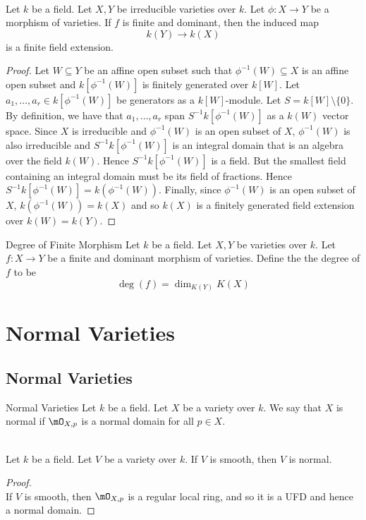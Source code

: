 \documentclass[a4paper]{article}
\begin{document}
\begin{prp}{}{}\\
Let $k$ be a field. Let $X,Y$ be irreducible varieties over $k$. Let $\phi:X\to Y$ be a morphism of varieties. If $f$ is finite and dominant, then the induced map $$k(Y)\to k(X)$$ is a finite field extension. 
\begin{proof}
Let $W\subseteq Y$ be an affine open subset such that $\phi^{-1}(W)\subseteq X$ is an affine open subset and $k[\phi^{-1}(W)]$ is finitely generated over $k[W]$. Let $a_1,\dots,a_r\in k[\phi^{-1}(W)]$ be generators as a $k[W]$-module. Let $S=k[W]\setminus\{0\}$. By definition, we have that $a_1,\dots,a_r$ span $S^{-1}k[\phi^{-1}(W)]$ as a $k(W)$ vector space. Since $X$ is irreducible and $\phi^{-1}(W)$ is an open subset of $X$, $\phi^{-1}(W)$ is also irreducible and $S^{-1}k[\phi^{-1}(W)]$ is an integral domain that is an algebra over the field $k(W)$. Hence $S^{-1}k[\phi^{-1}(W)]$ is a field. But the smallest field containing an integral domain must be its field of fractions. Hence $S^{-1}k[\phi^{-1}(W)]=k(\phi^{-1}(W))$. Finally, since $\phi^{-1}(W)$ is an open subset of $X$, $k(\phi^{-1}(W))=k(X)$ and so $k(X)$ is a finitely generated field extension over $k(W)=k(Y)$. 
\end{proof}
\end{prp}

\begin{defn}{Degree of Finite Morphism}{} Let $k$ be a field. Let $X,Y$ be varieties over $k$. Let $f:X\to Y$ be a finite and dominant morphism of varieties. Define the the degree of $f$ to be $$\deg(f)=\dim_{K(Y)}K(X)$$
\end{defn}

\pagebreak
\section{Normal Varieties}
\subsection{Normal Varieties}
\begin{defn}{Normal Varieties}{} Let $k$ be a field. Let $X$ be a variety over $k$. We say that $X$ is normal if $\mO_{X,p}$ is a normal domain for all $p\in X$. 
\end{defn}

\begin{lmm}{}{}\\
Let $k$ be a field. Let $V$ be a variety over $k$. If $V$ is smooth, then $V$ is normal. 
\begin{proof}\\
If $V$ is smooth, then $\mO_{X,p}$ is a regular local ring, and so it is a UFD and hence a normal domain. 
\end{proof}
\end{lmm}
\end{document}
